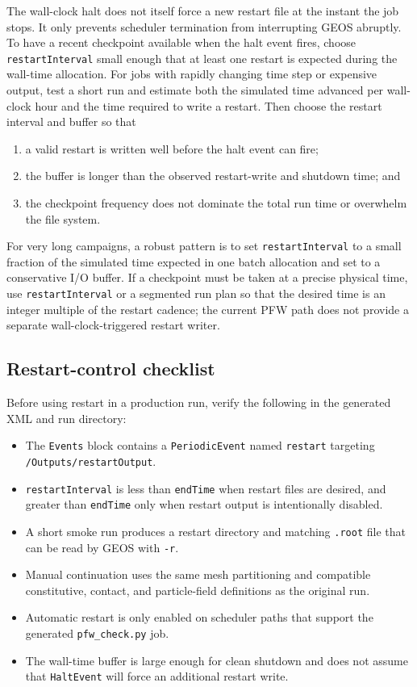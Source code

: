 The wall-clock halt does not itself force a new restart file at the instant the job stops.  It only prevents scheduler termination from interrupting GEOS abruptly.  To have a recent checkpoint available when the halt event fires, choose \texttt{restartInterval} small enough that at least one restart is expected during the wall-time allocation.  For jobs with rapidly changing time step or expensive output, test a short run and estimate both the simulated time advanced per wall-clock hour and the time required to write a restart.  Then choose the restart interval and buffer so that
\begin{enumerate}[leftmargin=*]
\item a valid restart is written well before the halt event can fire;
\item the buffer is longer than the observed restart-write and shutdown time; and
\item the checkpoint frequency does not dominate the total run time or overwhelm the file system.
\end{enumerate}

For very long campaigns, a robust pattern is to set \texttt{restartInterval} to a small fraction of the simulated time expected in one batch allocation and set  to a conservative I/O buffer.  If a checkpoint must be taken at a precise physical time, use \texttt{restartInterval} or a segmented run plan so that the desired time is an integer multiple of the restart cadence; the current PFW path does not provide a separate wall-clock-triggered restart writer.

\subsection{Restart-control checklist}
\label{sec:pfw-restart-checklist}

Before using restart in a production run, verify the following in the generated XML and run directory:
\begin{itemize}[leftmargin=*]
\item The \texttt{Events} block contains a \texttt{PeriodicEvent} named \texttt{restart} targeting \texttt{/Outputs/restartOutput}.
\item \texttt{restartInterval} is less than \texttt{endTime} when restart files are desired, and greater than \texttt{endTime} only when restart output is intentionally disabled.
\item A short smoke run produces a restart directory and matching \texttt{.root} file that can be read by GEOS with \texttt{-r}.
\item Manual continuation uses the same mesh partitioning and compatible constitutive, contact, and particle-field definitions as the original run.
\item Automatic restart is only enabled on scheduler paths that support the generated \texttt{pfw\_check.py} job.
\item The wall-time buffer is large enough for clean shutdown and does not assume that \texttt{HaltEvent} will force an additional restart write.
\end{itemize}
